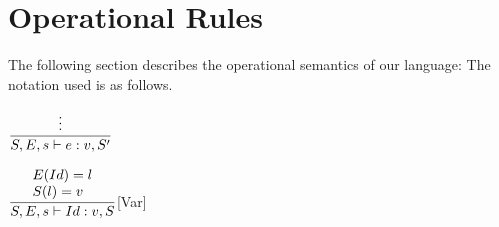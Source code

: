 
\section{Operational Rules}
The following section describes the operational semantics of our language:
The notation used is as follows.

\hspace*{10em} $\dfrac{
\vdots
}{S, E, s \vdash{}e:v,S^{\prime}}$ \bigskip

\hspace*{10em} $\dfrac{
\begin{array}{l}
    E(Id) = l \\
    S(l) = v
\end{array}
}{S, E, s \vdash{} Id:v,S }$[Var]\bigskip
